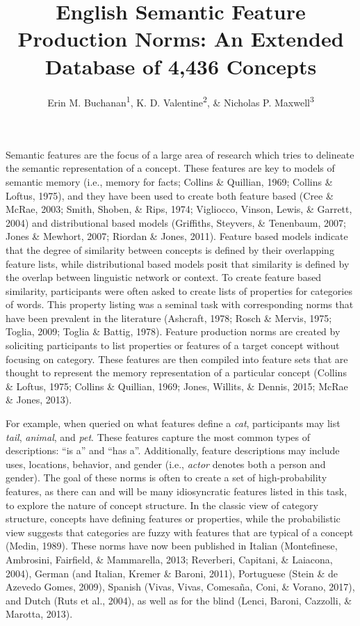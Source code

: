 \documentclass[english,,man]{apa6}
\title{English Semantic Feature Production Norms: An Extended Database of 4,436 Concepts}
\author{Erin M. Buchanan\textsuperscript{1}, K. D. Valentine\textsuperscript{2}, \& Nicholas P. Maxwell\textsuperscript{3}}
\date{}
\affiliation{
\vspace{0.5cm}
\textsuperscript{1} Harrisburg University of Science and Technology\\\textsuperscript{2} University of Missouri\\\textsuperscript{3} University of Southern Mississippi}
\begin{document}
\maketitle

Semantic features are the focus of a large area of research which tries to delineate the semantic representation of a concept. These features are key to models of semantic memory (i.e., memory for facts; Collins \& Quillian, 1969; Collins \& Loftus, 1975), and they have been used to create both feature based (Cree \& McRae, 2003; Smith, Shoben, \& Rips, 1974; Vigliocco, Vinson, Lewis, \& Garrett, 2004) and distributional based models (Griffiths, Steyvers, \& Tenenbaum, 2007; Jones \& Mewhort, 2007; Riordan \& Jones, 2011). Feature based models indicate that the degree of similarity between concepts is defined by their overlapping feature lists, while distributional based models posit that similarity is defined by the overlap between linguistic network or context. To create feature based similarity, participants were often asked to create lists of properties for categories of words. This property listing was a seminal task with corresponding norms that have been prevalent in the literature (Ashcraft, 1978; Rosch \& Mervis, 1975; Toglia, 2009; Toglia \& Battig, 1978). Feature production norms are created by soliciting participants to list properties or features of a target concept without focusing on category. These features are then compiled into feature sets that are thought to represent the memory representation of a particular concept (Collins \& Loftus, 1975; Collins \& Quillian, 1969; Jones, Willits, \& Dennis, 2015; McRae \& Jones, 2013).

For example, when queried on what features define a \emph{cat}, participants may list \emph{tail}, \emph{animal}, and \emph{pet}. These features capture the most common types of descriptions: \enquote{is a} and \enquote{has a}. Additionally, feature descriptions may include uses, locations, behavior, and gender (i.e., \emph{actor} denotes both a person and gender). The goal of these norms is often to create a set of high-probability features, as there can and will be many idiosyncratic features listed in this task, to explore the nature of concept structure. In the classic view of category structure, concepts have defining features or properties, while the probabilistic view suggests that categories are fuzzy with features that are typical of a concept (Medin, 1989). These norms have now been published in Italian (Montefinese, Ambrosini, Fairfield, \& Mammarella, 2013; Reverberi, Capitani, \& Laiacona, 2004), German (and Italian, Kremer \& Baroni, 2011), Portuguese (Stein \& de Azevedo Gomes, 2009), Spanish (Vivas, Vivas, Comesaña, Coni, \& Vorano, 2017), and Dutch (Ruts et al., 2004), as well as for the blind (Lenci, Baroni, Cazzolli, \& Marotta, 2013).
\end{document}
